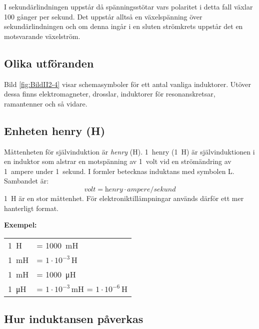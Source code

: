 I sekundärlindningen uppstår då spänningsstötar vars polaritet i detta fall
växlar 100 gånger per sekund. Det uppstår alltså en växelspänning över
sekundärlindningen och om denna ingår i en sluten strömkrets uppstår det en
motsvarande växelström.


\subsection{Olika utföranden}

Bild \ref{fig:BildII2-4} visar schemasymboler för ett antal vanliga induktorer.
Utöver dessa finns elektromagneter, drosslar, induktorer för resonanskretsar,
ramantenner och så vidare.

\subsection{Enheten henry (H)}
\label{enheten_henry}

Måttenheten för självinduktion är \emph{henry} (\si{\henry}).
1~henry (\SI{1}{\henry}) är självinduktionen i en induktor som alstrar en
motspänning av 1~volt vid en strömändring av 1~ampere under 1~sekund.
I formler betecknas induktans med symbolen L.
Sambandet är:
\[\textit{volt} = \textit{henry} \cdot \textit{ampere}/\textit{sekund}\]
\SI{1}{\henry} är en stor måttenhet.
För elektroniktillämpningar används därför ett mer hanterligt format.

\noindent\textbf{Exempel:}

\begin{center}
\begin{tabular}{ll}
\SI{1}{\henry} & = \SI{1000}{\milli\henry} \\
\SI{1}{\milli\henry} & = \(1 \cdot 10^{-3}\)\,H \\
\SI{1}{\milli\henry} & = \SI{1000}{\micro\henry} \\
\SI{1}{\micro\henry} & = \(1 \cdot 10^{-3}\)\,mH = \(1 \cdot 10^{-6}\)\,H
\end{tabular}
\end{center}

\subsection{Hur induktansen påverkas}


